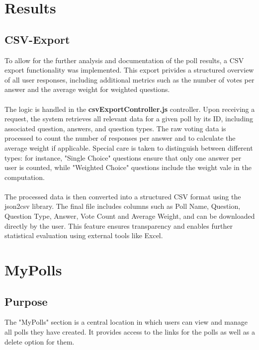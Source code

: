 \documentclass[a4paper,12pt]{report}
\begin{document}
\section{Results}
\subsection{CSV-Export}
To allow for the further analysis and documentation of the poll results, a CSV export functionality was implemented. This export privides a structured overview of all user responses, including additional metrics such as the number of votes per answer and the average weight for weighted questions.\\ \\
The logic is handled in the \textbf{csvExportController.js} controller. Upon receiving a request, the system retrieves all relevant data for a given poll by its ID, including associated question, answers, and question types. The raw voting data is processed to count the number of responses per answer and to calculate the average weight if applicable. Special care is taken to distinguish between different types: for instance, "Single Choice" questions ensure that only one answer per user is counted, while "Weighted Choice" questions include the weight vale in the computation.\\ \\
The processed data is then converted into a structured CSV format using the json2csv library. The final file includes columns such as Poll Name, Question, Question Type, Answer, Vote Count and Average Weight, and can be downloaded directly by the user. This feature ensures transparency and enables further statistical evaluation using external tools like Excel.\parencite{json2csv}

\section{MyPolls}
\subsection{Purpose}
The "MyPolls" section is a central location in which users can view and manage all polls they have created. It provides access to the links for the polls as well as a delete option for them.
\end{document}
